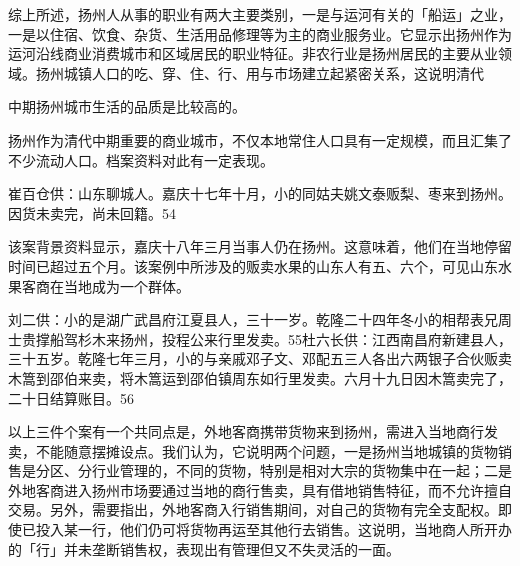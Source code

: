 综上所述，扬州人从事的职业有两大主要类别，一是与运河有关的「船运」之业，一是以住宿、饮食、杂货、生活用品修理等为主的商业服务业。它显示出扬州作为运河沿线商业消费城市和区域居民的职业特征。非农行业是扬州居民的主要从业领域。扬州城镇人口的吃、穿、住、行、用与市场建立起紧密关系，这说明清代

\vfill
\begin{BookNotes}
\end{BookNotes}

\noindent 中期扬州城市生活的品质是比较高的。


扬州作为清代中期重要的商业城市，不仅本地常住人口具有一定规模，而且汇集了不少流动人口。档案资料对此有一定表现。


\begin{BookQuote}
崔百仓供：山东聊城人。嘉庆十七年十月，小的同姑夫姚文泰贩梨、枣来到扬州。因货未卖完，尚未回籍。54
\end{BookQuote}

该案背景资料显示，嘉庆十八年三月当事人仍在扬州。这意味着，他们在当地停留时间已超过五个月。该案例中所涉及的贩卖水果的山东人有五、六个，可见山东水果客商在当地成为一个群体。

\begin{BookQuote}
刘二供：小的是湖广武昌府江夏县人，三十一岁。乾隆二十四年冬小的相帮表兄周士贵撑船驾杉木来扬州，投程公来行里发卖。55杜六长供：江西南昌府新建县人，三十五岁。乾隆七年三月，小的与亲戚邓子文、邓配五三人各出六两银子合伙贩卖木篙到邵伯来卖，将木篙运到邵伯镇周东如行里发卖。六月十九日因木篙卖完了，二十日结算账目。56
\end{BookQuote}

以上三件个案有一个共同点是，外地客商携带货物来到扬州，需进入当地商行发卖，不能随意摆摊设点。我们认为，它说明两个问题，一是扬州当地城镇的货物销售是分区、分行业管理的，不同的货物，特别是相对大宗的货物集中在一起；二是外地客商进入扬州市场要通过当地的商行售卖，具有借地销售特征，而不允许擅自交易。另外，需要指出，外地客商入行销售期间，对自己的货物有完全支配权。即使已投入某一行，他们仍可将货物再运至其他行去销售。这说明，当地商人所开办的「行」并未垄断销售权，表现出有管理但又不失灵活的一面。

